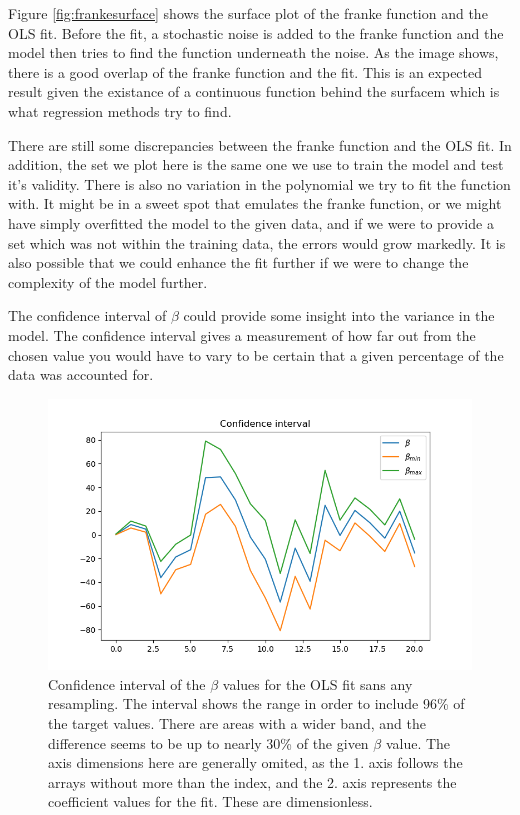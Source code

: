 \documentclass[ 12pt, a4paper ]{article}
\begin{document}
Figure \ref{fig:frankesurface} shows the surface plot of the franke function and the OLS fit. 
Before the fit, a stochastic noise is added to the franke function and the model then tries to
find the function underneath the noise. As the image shows, there is a good overlap of the 
franke function and the fit. This is an expected result given the existance of a continuous 
function behind the surfacem which is what regression methods try to find. 

There are still some discrepancies between the franke function and the OLS fit. In addition, the 
set we plot here is the same one we use to train the model and test it's validity. There is also 
no variation in the polynomial we try to fit the function with. It might be in a sweet spot that 
emulates the franke function, or we might have simply overfitted the model to the given data, 
and if we were to provide a set which was not within the training data, the errors would grow
markedly. It is also possible that we could enhance the fit further if we were to change the 
complexity of the model further.

The confidence interval of $\beta$ could provide some insight into the variance in the model. 
The confidence interval gives a measurement of how far out from the chosen value you would have 
to vary to be certain that a given percentage of the data was accounted for. 

\begin{figure}
\includegraphics[scale=0.7]{frankeci.png}
\caption{
    Confidence interval of the $\beta$ values for the OLS fit sans any resampling. 
    The interval shows the range in order to include 96\% of the target values. There are 
    areas with a wider band, and the difference seems to be up to nearly 30\% of the given 
    $\beta$ value. The axis dimensions here are generally omited, as the 1. axis follows the 
    arrays without more than the index, and the 2. axis represents the coefficient values for
    the fit. These are dimensionless. 
}
\label{fig:frankeolsci}
\end{figure}
\end{document}
